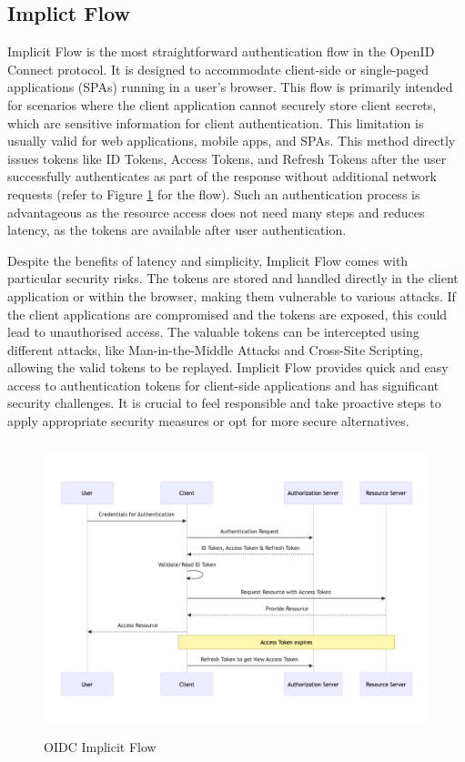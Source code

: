 \subsection{Implict Flow}
Implicit Flow is the most straightforward authentication flow in the OpenID Connect protocol. It is designed to accommodate client-side or single-paged applications (SPAs) running in a user's browser. This flow is primarily intended for scenarios where the client application cannot securely store client secrets, which are sensitive information for client authentication. This limitation is usually valid for web applications, mobile apps, and SPAs. This method directly issues tokens like ID Tokens, Access Tokens, and Refresh Tokens after the user successfully authenticates as part of the response without additional network requests (refer to Figure \ref{fig:implicit_flow} for the flow). Such an authentication process is advantageous as the resource access does not need many steps and reduces latency, as the tokens are available after user authentication. 

Despite the benefits of latency and simplicity, Implicit Flow comes with particular security risks. The tokens are stored and handled directly in the client application or within the browser, making them vulnerable to various attacks. If the client applications are compromised and the tokens are exposed, this could lead to unauthorised access. The valuable tokens can be intercepted using different attacks, like Man-in-the-Middle Attacks and Cross-Site Scripting, allowing the valid tokens to be replayed. Implicit Flow provides quick and easy access to authentication tokens for client-side applications and has significant security challenges. It is crucial to feel responsible and take proactive steps to apply appropriate security measures or opt for more secure alternatives.

\begin{figure}[h!]
\centering
\label{fig:implicit_flow}
\includegraphics[width=\textwidth, height=320px]{pics/implicit_flow.png}
\caption{OIDC Implicit Flow}
\end{figure}

